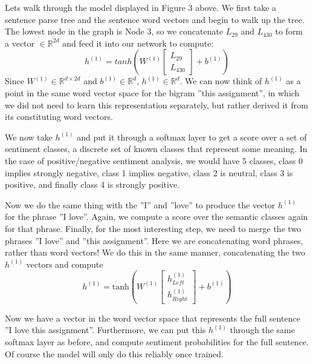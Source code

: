 \documentclass{tufte-handout}
\begin{document}
Lets walk through the model displayed in Figure 3 above. We first take a sentence parse tree and the sentence word vectors and begin to walk up the tree. The lowest node in the graph is Node 3, so we concatenate $L_{29}$ and $L_{430}$ to form a vector $\in \mathbb{R}^{2d}$ and feed it into our network to compute:
\begin{equation} 
h^{(1)} = tanh(W^{(1)} \left[ \begin{array}{c} L_{29} \\ L_{430} \end{array} \right] + b^{(1)}) 
\end{equation} 
Since $ W^{(1)} \in \mathbb{R}^{d \times 2d}$ and $ b^{(1)} \in \mathbb{R}^{d}$, $ h^{(1)} \in \mathbb{R}^{d}$. We can now think of $h^{(1)}$ as a point in the same word vector space for the bigram ''this assignment'', in which we did not need to learn this representation separately, but rather derived it from its constituting word vectors. 

We now take $h^{(1)}$ and put it through a softmax layer to get a score over a set of sentiment classes, a discrete set of known classes that represent some meaning. In the case of positive/negative sentiment analysis, we would have 5 classes, class 0 implies strongly negative, class 1 implies negative, class 2 is neutral, class 3 is positive, and finally class 4 is strongly positive. 

Now we do the same thing with the ''I'' and ''love'' to produce the vector $h^{(1)}$ for the phrase ''I love''. Again, we compute a score over the semantic classes again for that phrase. Finally, for the most interesting step, we need to merge the two phrases ''I love'' and ''this assignment''. Here we are concatenating word phrases, rather than word vectors! We do this in the same manner, concatenating the two $h^{(1)}$ vectors and compute 
\begin{equation} 
 h^{(1)} = \text{tanh}(W^{(1)}  \left[ \begin{array}{c} h^{(1)}_{Left} \\ h^{(1)}_{Right} \end{array} \right] + b^{(1)}) 
\end{equation} 

Now we have a vector in the word vector space that represents the full sentence ''I love this assignment''. Furthermore, we can put this $h^{(1)}$ through the same softmax layer as before, and compute sentiment probabilities for the full sentence. Of course the model will only do this reliably once trained.
\end{document}
